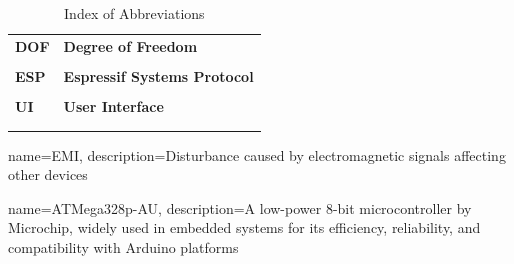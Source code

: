 \documentclass[12pt,a4paper]{article}
\begin{document}
\begin{longtable}{@{}p{}p{}@{}}
\\[-0.5em]  
\textbf{DOF} \index{DOF} & \textbf{Degree of Freedom} \index{Degree of Freedom} \\
\\[-0.5em]  
\textbf{ESP} \index{ESP} & \textbf{Espressif Systems Protocol} \index{Espressif Systems Protocol} \\
\\[-0.5em] 
\textbf{UI} \index{UI} & \textbf{User Interface} \index{User Interface} \\
\\[-0.5em]  
\caption{Index of Abbreviations} \label{tab:Index of abbreviations}
\end{longtable}



\clearpage

{
    name=EMI,
    description={Disturbance caused by electromagnetic signals affecting other devices}
}

{
    name=ATMega328p-AU,
    description={A low-power 8-bit microcontroller by Microchip, widely used in embedded systems for its efficiency, reliability, and compatibility with Arduino platforms}
}
\end{document}
